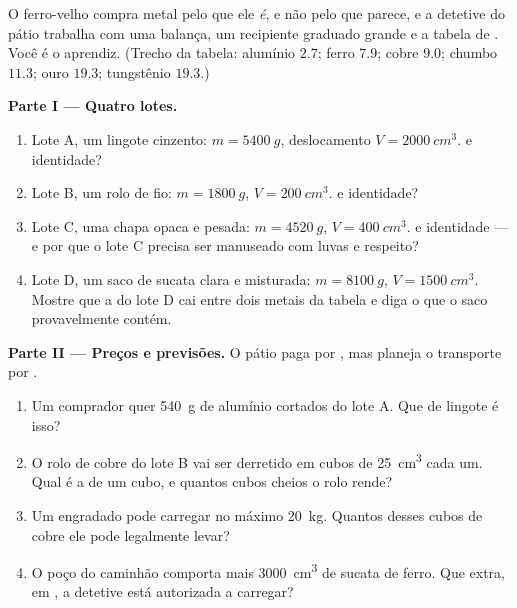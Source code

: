 \begin{problem}\label{pb:g7:volume-mass-density:1}
O ferro-velho compra metal pelo que ele \emph{é}, e não pelo que
parece, e a detetive do pátio trabalha com uma balança, um recipiente
graduado grande e a tabela de . Você é o aprendiz. (Trecho
da tabela: alumínio $2.7$; ferro $7.9$; cobre $9.0$; chumbo $11.3$;
ouro $19.3$; tungstênio $19.3$.)

\medskip\noindent\textbf{Parte I --- Quatro lotes.}
\begin{enumerate}
  \item Lote A, um lingote cinzento: $m = \qty{5400}{g}$,
        deslocamento $V = \qty{2000}{cm^3}$.  e identidade?
  \item Lote B, um rolo de fio: $m = \qty{1800}{g}$,
        $V = \qty{200}{cm^3}$.  e identidade?
  \item Lote C, uma chapa opaca e pesada: $m = \qty{4520}{g}$,
        $V = \qty{400}{cm^3}$.  e identidade --- e por que
        o lote C precisa ser manuseado com luvas e respeito?
  \item Lote D, um saco de sucata clara e misturada:
        $m = \qty{8100}{g}$, $V = \qty{1500}{cm^3}$. Mostre que a
         do lote D cai entre dois metais da tabela e diga o
        que o saco provavelmente contém.
\end{enumerate}

\medskip\noindent\textbf{Parte II --- Preços e previsões.}
O pátio paga por , mas planeja o transporte por .
\begin{enumerate}[resume]
  \item Um comprador quer \qty{540}{g} de alumínio cortados do lote
        A. Que  de lingote é isso?
  \item O rolo de cobre do lote B vai ser derretido em cubos de
        \qty{25}{cm^3} cada um. Qual é a  de um cubo, e quantos
        cubos cheios o rolo rende?
  \item Um engradado pode carregar no máximo \qty{20}{kg}. Quantos
        desses cubos de cobre ele pode legalmente levar?
  \item O poço do caminhão comporta mais \qty{3000}{cm^3} de sucata
        de ferro. Que  extra, em , a detetive está
        autorizada a carregar?
\end{enumerate}


\end{problem}
